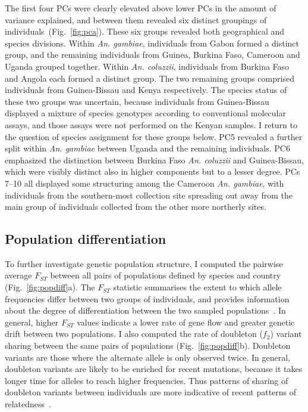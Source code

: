 \documentclass[a4paper,11pt,abstracton,hidelinks]{scrartcl}
\begin{document}
The first four PCs were clearly elevated above lower PCs in the amount of variance explained, and between them revealed six distinct groupings of individuals~(Fig.~\ref{fig:pca}).
%
These six groups revealed both geographical and species divisions.
%
Within \textit{An. gambiae}, individuals from Gabon formed a distinct group, and the remaining individuals from Guinea, Burkina Faso, Cameroon and Uganda grouped together.
%
Within \textit{An. coluzzii}, individuals from Burkina Faso and Angola each formed a distinct group.
%
The two remaining groups comprised individuals from Guinea-Bissau and Kenya respectively.
%
The species status of these two groups was uncertain, because individuals from Guinea-Bissau displayed a mixture of species genotypes according to conventional molecular assays, and those assays were not performed on the Kenyan samples.
%
I return to the question of species assignment for these groups below.
%
PC5 revealed a further split within \textit{An. gambiae} between Uganda and the remaining individuals.
%
PC6 emphasized the distinction between Burkina Faso \textit{An. coluzzii} and Guinea-Bissau, which were visibly distinct also in higher components but to a lesser degree.
%
PCs 7--10 all displayed some structuring among the Cameroon \textit{An. gambiae}, with individuals from the southern-most collection site spreading out away from the main group of individuals collected from the other more northerly sites.


\subsection{Population differentiation}\label{subsec:pop-diff}


To further investigate genetic population structure, I computed the pairwise average $F_{ST}$ between all pairs of populations defined by species and country (Fig.~\ref{fig:popdiff}a).
%
The $F_{ST}$ statistic summarises the extent to which allele frequencies differ between two groups of individuals, and provides information about the degree of differentiation between the two sampled populations~\parencite{Rousset1997,Holsinger2009,Bhatia2013}.
%
In general, higher $F_{ST}$ values indicate a lower rate of gene flow and greater genetic drift between two populations.
%
I also computed the rate of doubleton ($f_{2}$) variant sharing between the same pairs of populations (Fig.~\ref{fig:popdiff}b).
%
Doubleton variants are those where the alternate allele is only observed twice.
%
In general, doubleton variants are likely to be enriched for recent mutations, because it takes longer time for alleles to reach higher frequencies.
%
Thus patterns of sharing of doubleton variants between individuals are more indicative of recent patterns of relatedness~\parencite{1000G2012}.
\end{document}
